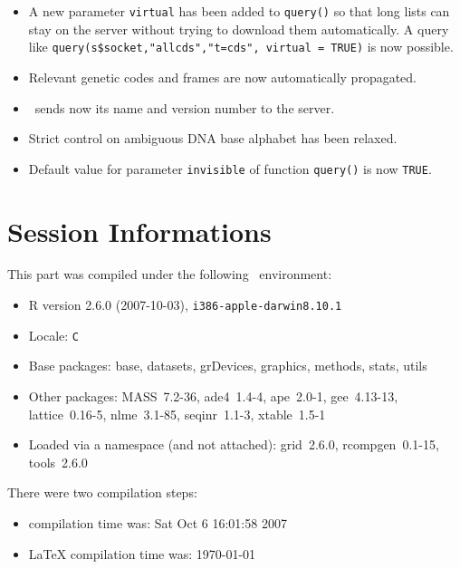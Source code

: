 \documentclass{article}
\begin{document}
\begin{itemize}
\item A new parameter \texttt{virtual} has been added to \texttt{query()} 
so that long lists can stay on the server without trying to download
them automatically. A query like \texttt{query(s\$socket,"allcds","t=cds", virtual = TRUE)} is 
now possible.

\item Relevant genetic codes and frames are now automatically propagated.

\item \Seqinr{}~sends now its name and version number to the server.

\item Strict control on ambiguous DNA base alphabet has been relaxed.

\item Default value for parameter \texttt{invisible} of function \texttt{query()} is now \texttt{TRUE}.

\end{itemize}



\section{Session Informations}

This part was compiled under the following \Rlogo{}~environment:

\begin{itemize}
  \item R version 2.6.0 (2007-10-03), \verb|i386-apple-darwin8.10.1|
  \item Locale: \verb|C|
  \item Base packages: base, datasets, grDevices, graphics, methods,
    stats, utils
  \item Other packages: MASS~7.2-36, ade4~1.4-4, ape~2.0-1,
    gee~4.13-13, lattice~0.16-5, nlme~3.1-85, seqinr~1.1-3,
    xtable~1.5-1
  \item Loaded via a namespace (and not attached): grid~2.6.0,
    rcompgen~0.1-15, tools~2.6.0
\end{itemize}
There were two compilation steps:

\begin{itemize}
  \item \Rlogo{} compilation time was: Sat Oct  6 16:01:58 2007
  \item \LaTeX{} compilation time was: \today
\end{itemize}



\clearpage
{}


\end{document}
